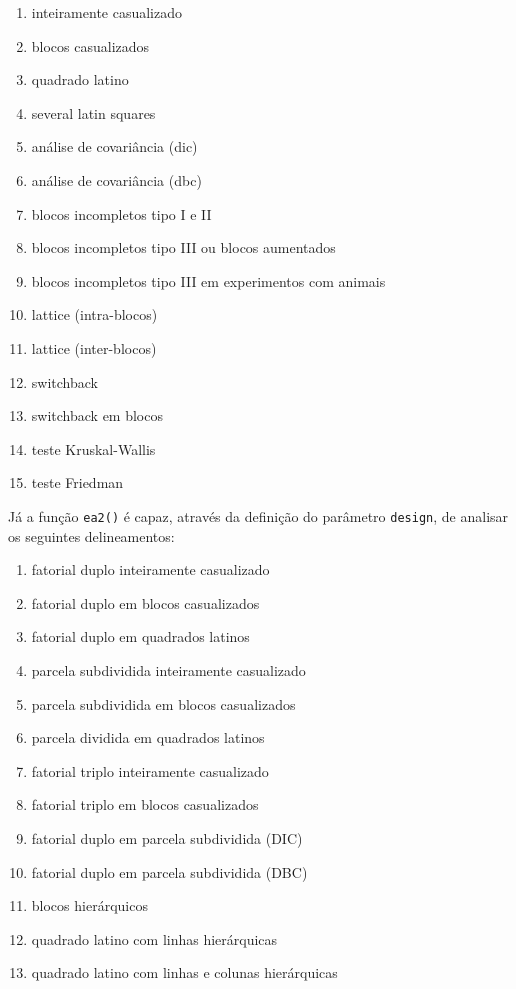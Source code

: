 \documentclass[
]{article}
\providecommand{\tightlist}{%
  \setlength{\itemsep}{0pt}\setlength{\parskip}{0pt}}
\begin{document}
\begin{enumerate}
\def\labelenumi{\arabic{enumi}.}
\tightlist
\item
  inteiramente casualizado
\item
  blocos casualizados
\item
  quadrado latino
\item
  several latin squares
\item
  análise de covariância (dic)
\item
  análise de covariância (dbc)
\item
  blocos incompletos tipo I e II
\item
  blocos incompletos tipo III ou blocos aumentados
\item
  blocos incompletos tipo III em experimentos com animais
\item
  lattice (intra-blocos)
\item
  lattice (inter-blocos)
\item
  switchback
\item
  switchback em blocos
\item
  teste Kruskal-Wallis
\item
  teste Friedman
\end{enumerate}

Já a função \texttt{ea2()} é capaz, através da definição do parâmetro \texttt{design}, de analisar os seguintes delineamentos:

\begin{enumerate}
\def\labelenumi{\arabic{enumi}.}
\tightlist
\item
  fatorial duplo inteiramente casualizado
\item
  fatorial duplo em blocos casualizados
\item
  fatorial duplo em quadrados latinos
\item
  parcela subdividida inteiramente casualizado
\item
  parcela subdividida em blocos casualizados
\item
  parcela dividida em quadrados latinos
\item
  fatorial triplo inteiramente casualizado
\item
  fatorial triplo em blocos casualizados
\item
  fatorial duplo em parcela subdividida (DIC)
\item
  fatorial duplo em parcela subdividida (DBC)
\item
  blocos hierárquicos
\item
  quadrado latino com linhas hierárquicas
\item
  quadrado latino com linhas e colunas hierárquicas
\end{enumerate}
\end{document}
